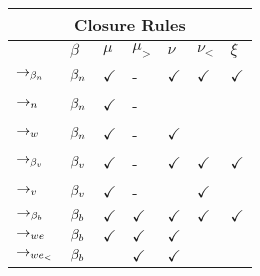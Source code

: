\begin{table}
	\centering
	\begin{tabularx}{\linewidth}{|X|XXXXXX|}
		\hline
		\multicolumn{7}{|c|}{\textbf{Closure Rules}}\\
		\hline
		       & {$\beta$} & $\mu$        & $\mu_>$     & $\nu$        & $\nu_<$      & $\xi$ \\
		\hline
		$\to_{\beta_n}$   & $\beta_n$ & $\checkmark$ & -           & $\checkmark$ & $\checkmark$ & $\checkmark$ \\
		\hline
		$\to_n$    & $\beta_n$ & $\checkmark$ & -           & 						 &              & \\
		\hline
		$\to_w$    & $\beta_n$ & $\checkmark$ & -           & $\checkmark$ &              & \\
		\hline
    $\to_{\beta_v}$   & $\beta_v$ & $\checkmark$ & -           & $\checkmark$ & $\checkmark$ & $\checkmark$ \\
    \hline
    $\to_v$    & $\beta_v$ & $\checkmark$ & -           & 						 & $\checkmark$ & \\
    \hline
    $\to_{\beta_b}$ & $\beta_b$ & $\checkmark$ & $\checkmark$ & $\checkmark$ & $\checkmark$ & $\checkmark$ \\
    \hline
    $\to_{we}$   & $\beta_b$ & $\checkmark$ & $\checkmark$ & $\checkmark$ &              & \\
    \hline
    $\to_{we_<}$  & $\beta_b$ &              & $\checkmark$ & $\checkmark$ &              & \\
    \hline
	\end{tabularx}
	\end{table}

